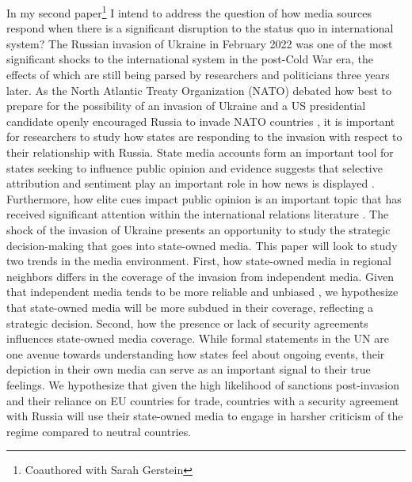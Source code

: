 \documentclass[12pt]{article}
\begin{document}
In my second paper\footnote{Coauthored with Sarah Gerstein} I intend to address the question of how media sources respond when there is a significant disruption to the status quo in international system? The Russian invasion of Ukraine in February 2022 was one of the most significant shocks to the international system in the post-Cold War era, the effects of which are still being parsed by researchers and politicians three years later. As the North Atlantic Treaty Organization (NATO) debated how best to prepare for the possibility of an invasion of Ukraine \autocite{jakes_for_2024} and a US presidential candidate openly encouraged Russia to invade NATO countries \autocite{sanger_outburst_2024}, it is important for researchers to study how states are responding to the invasion with respect to their relationship with Russia. State media accounts form an important tool for states seeking to influence public opinion \autocite{guriev_theory_2020} and evidence suggests that selective attribution and sentiment play an important role in how news is displayed \autocite{rozenas_how_2019}. Furthermore, how elite cues impact public opinion is an important topic that has received significant attention within the international relations literature \autocite{guisinger_mapping_2017}. The shock of the invasion of Ukraine presents an opportunity to study the strategic decision-making that goes into state-owned media. This paper will look to study two trends in the media environment. First, how state-owned media in regional neighbors differs in the coverage of the invasion from independent media. Given that independent media tends to be more reliable and unbiased \autocite{djankov_who_2003}, we hypothesize that state-owned media will be more subdued in their coverage, reflecting a strategic decision. Second, how the presence or lack of security agreements influences state-owned media coverage. While formal statements in the UN are one avenue towards understanding how states feel about ongoing events, their depiction in their own media can serve as an important signal to their true feelings. We hypothesize that given the high likelihood of sanctions post-invasion and their reliance on EU countries for trade, countries with a security agreement with Russia will use their state-owned media to engage in harsher criticism of the regime compared to neutral countries.
\end{document}
